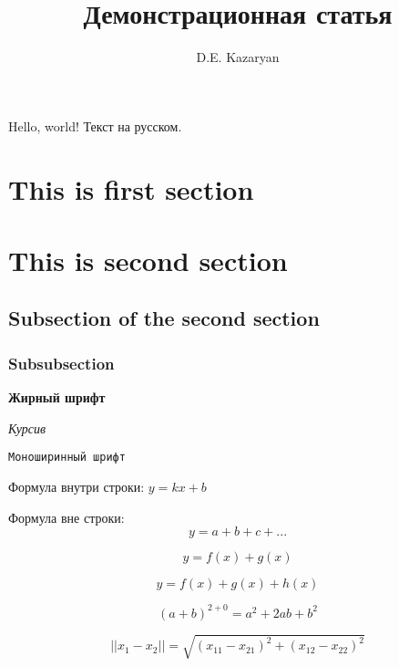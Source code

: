 \documentclass[a4paper,12pt]{article}
\title{Демонстрационная статья}
\date{}
\author{D.E. Kazaryan}
\begin{document}
\maketitle


Hello, world! Текст на русском.

\section{This is first section}

\section{This is second section}

\subsection{Subsection of the second section}

\subsubsection{Subsubsection}

\textbf{Жирный шрифт}

\textit{Курсив}

\texttt{Моноширинный шрифт}

Формула внутри строки: $y=kx+b$

Формула вне строки: $$y=a+b+c+...$$

\begin{equation}
    y = f(x) + g(x)
\end{equation}

\begin{equation*}
    y = f(x) + g(x) + h(x)
\end{equation*}

\begin{equation}
    (a+b)^{2+0} = a^2 + 2 a b + b^2
\end{equation}

\begin{equation}
    ||x_1 - x_2|| = \sqrt{(x_{11} - x_{21})^2 + (x_{12} - x_{22})^2}
\end{equation}
\end{document}
